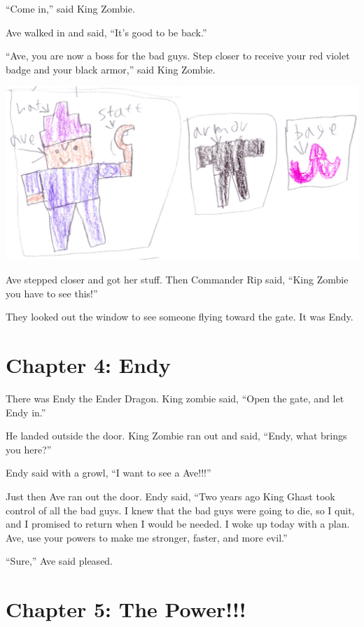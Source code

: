 \documentclass[12pt,oneside]{krantz}
\begin{document}
``Come in,'' said King Zombie.

Ave walked in and said, ``It's good to be back.''

``Ave, you are now a boss for the bad guys. Step closer to receive your
red violet badge and your black armor,'' said King Zombie.

\includegraphics[width=6.25in,height=\textheight]{img/avestuff.jpg}

Ave stepped closer and got her stuff. Then Commander Rip said, ``King
Zombie you have to see this!''

They looked out the window to see someone flying toward the gate. It was
Endy.

\hypertarget{chapter-4-endy}{%
\chapter*{Chapter 4: Endy}\label{chapter-4-endy}}


There was Endy the Ender Dragon. King zombie said, ``Open the gate, and
let Endy in.''

He landed outside the door. King Zombie ran out and said, ``Endy, what
brings you here?''

Endy said with a growl, ``I want to see a Ave!!!''

Just then Ave ran out the door. Endy said, ``Two years ago King Ghast
took control of all the bad guys. I knew that the bad guys were going to
die, so I quit, and I promised to return when I would be needed. I woke
up today with a plan. Ave, use your powers to make me stronger, faster,
and more evil.''

``Sure,'' Ave said pleased.

\hypertarget{chapter-5-the-power}{%
\chapter*{Chapter 5: The Power!!!}\label{chapter-5-the-power}}
\end{document}
